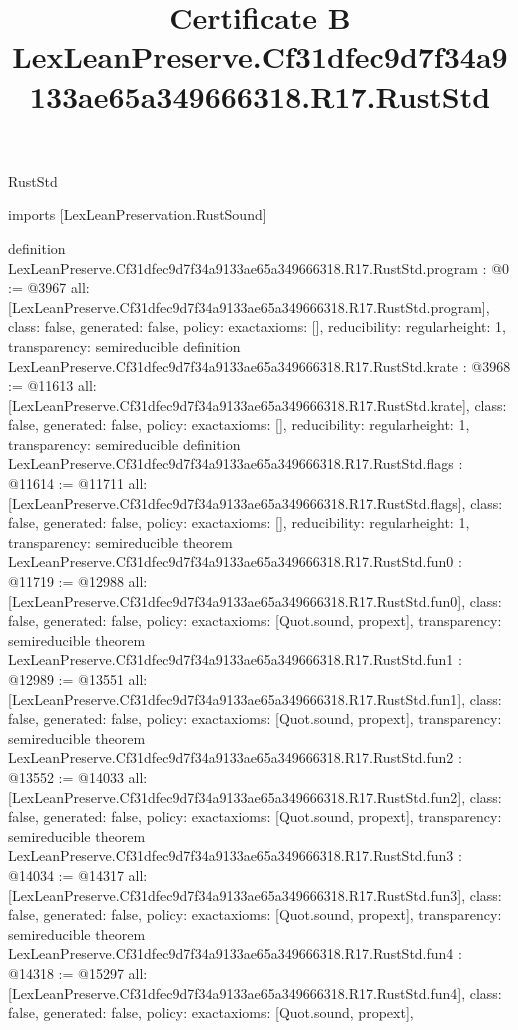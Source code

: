 \begin{lexlean}{RustStd}
\title{Certificate B LexLeanPreserve.Cf31dfec9d7f34a9133ae65a349666318.R17.RustStd}
\begin{coremodule}
imports [LexLeanPreservation.RustSound]

definition LexLeanPreserve.Cf31dfec9d7f34a9133ae65a349666318.R17.RustStd.program : @0 := @3967 {
  all: [LexLeanPreserve.Cf31dfec9d7f34a9133ae65a349666318.R17.RustStd.program],
  class: false,
  generated: false,
  policy: exact{axioms: []},
  reducibility: regular{height: 1},
  transparency: semireducible
}
definition LexLeanPreserve.Cf31dfec9d7f34a9133ae65a349666318.R17.RustStd.krate : @3968 := @11613 {
  all: [LexLeanPreserve.Cf31dfec9d7f34a9133ae65a349666318.R17.RustStd.krate],
  class: false,
  generated: false,
  policy: exact{axioms: []},
  reducibility: regular{height: 1},
  transparency: semireducible
}
definition LexLeanPreserve.Cf31dfec9d7f34a9133ae65a349666318.R17.RustStd.flags : @11614 := @11711 {
  all: [LexLeanPreserve.Cf31dfec9d7f34a9133ae65a349666318.R17.RustStd.flags],
  class: false,
  generated: false,
  policy: exact{axioms: []},
  reducibility: regular{height: 1},
  transparency: semireducible
}
theorem LexLeanPreserve.Cf31dfec9d7f34a9133ae65a349666318.R17.RustStd.fun0 : @11719 := @12988 {
  all: [LexLeanPreserve.Cf31dfec9d7f34a9133ae65a349666318.R17.RustStd.fun0],
  class: false,
  generated: false,
  policy: exact{axioms: [Quot.sound, propext]},
  transparency: semireducible
}
theorem LexLeanPreserve.Cf31dfec9d7f34a9133ae65a349666318.R17.RustStd.fun1 : @12989 := @13551 {
  all: [LexLeanPreserve.Cf31dfec9d7f34a9133ae65a349666318.R17.RustStd.fun1],
  class: false,
  generated: false,
  policy: exact{axioms: [Quot.sound, propext]},
  transparency: semireducible
}
theorem LexLeanPreserve.Cf31dfec9d7f34a9133ae65a349666318.R17.RustStd.fun2 : @13552 := @14033 {
  all: [LexLeanPreserve.Cf31dfec9d7f34a9133ae65a349666318.R17.RustStd.fun2],
  class: false,
  generated: false,
  policy: exact{axioms: [Quot.sound, propext]},
  transparency: semireducible
}
theorem LexLeanPreserve.Cf31dfec9d7f34a9133ae65a349666318.R17.RustStd.fun3 : @14034 := @14317 {
  all: [LexLeanPreserve.Cf31dfec9d7f34a9133ae65a349666318.R17.RustStd.fun3],
  class: false,
  generated: false,
  policy: exact{axioms: [Quot.sound, propext]},
  transparency: semireducible
}
theorem LexLeanPreserve.Cf31dfec9d7f34a9133ae65a349666318.R17.RustStd.fun4 : @14318 := @15297 {
  all: [LexLeanPreserve.Cf31dfec9d7f34a9133ae65a349666318.R17.RustStd.fun4],
  class: false,
  generated: false,
  policy: exact{axioms: [Quot.sound, propext]},
}
\end{coremodule}
\end{lexlean}
